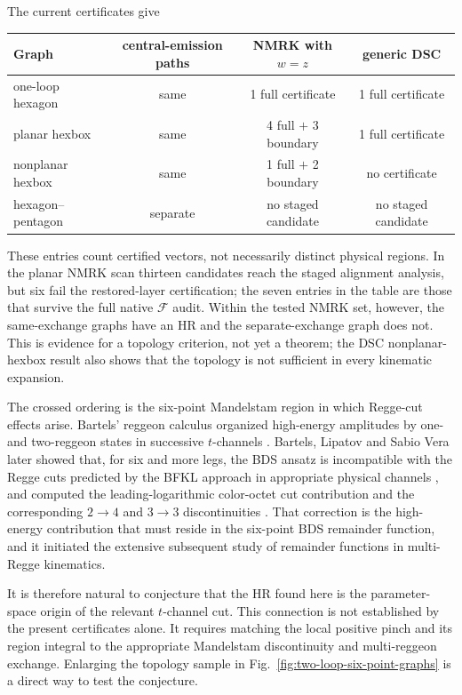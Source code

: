 \documentclass[a4paper,11pt]{article}
\begin{document}
The current certificates give
\begin{center}
\small
\begin{tabular}{@{}lccc@{}}
\toprule
Graph & central-emission paths & NMRK with \(w=z\) & generic DSC\\
\midrule
one-loop hexagon & same & 1 full certificate & 1 full certificate\\
planar hexbox & same & 4 full \(+\) 3 boundary & 1 full certificate\\
nonplanar hexbox & same & 1 full \(+\) 2 boundary & no certificate\\
hexagon--pentagon & separate & no staged candidate & no staged candidate\\
\bottomrule
\end{tabular}
\end{center}
These entries count certified vectors, not necessarily distinct physical
regions.  In the planar NMRK scan thirteen candidates reach the staged
alignment analysis, but six fail the restored-layer certification; the
seven entries in the table are those that survive the full native
\(\mathcal F\) audit.  Within the tested NMRK set, however, the same-exchange graphs have
an HR and the separate-exchange graph does not.  This is evidence for a
topology criterion, not yet a theorem; the DSC nonplanar-hexbox result also
shows that the topology is not sufficient in every kinematic expansion.

The crossed ordering is the six-point Mandelstam region in which Regge-cut
effects arise.  Bartels' reggeon calculus organized high-energy amplitudes
by one- and two-reggeon states in successive \(t\)-channels
\cite{Bartels:1980pe}.  Bartels, Lipatov and Sabio Vera later showed that, for
six and more legs, the BDS ansatz is incompatible with the Regge cuts
predicted by the BFKL approach in appropriate physical channels
\cite{Bartels:2008ce}, and computed the leading-logarithmic
color-octet cut contribution and the corresponding \(2\to4\) and \(3\to3\)
discontinuities \cite{Bartels:2008ce}.
That correction is the high-energy contribution that must reside in the
six-point BDS remainder function, and it initiated the extensive subsequent
study of remainder functions in multi-Regge kinematics.

It is therefore natural to conjecture that the HR found here is the
parameter-space origin of the relevant \(t\)-channel cut.  This connection
is not established by the present certificates alone.  It requires matching
the local positive pinch and its region integral to the appropriate
Mandelstam discontinuity and multi-reggeon exchange.  Enlarging the topology
sample in Fig.~\ref{fig:two-loop-six-point-graphs} is a direct way to test
the conjecture.
\end{document}
